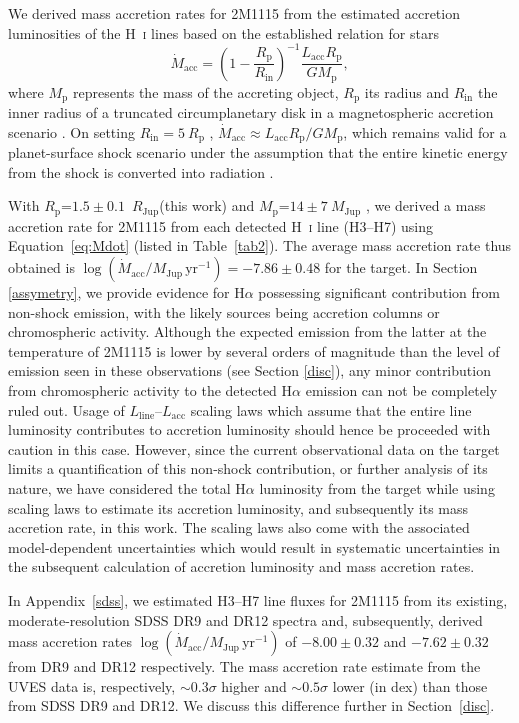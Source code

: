\documentclass{aa}
\newcommand{\mj}{\ensuremath{M_\mathrm{Jup}}\xspace}
\newcommand{\rj}{\ensuremath{R_\mathrm{Jup}}\xspace}
\newcommand{\mjyr}{\ensuremath{M_\mathrm{Jup}\,\mathrm{yr^{-1}}}\xspace}
\newcommand{\Mp}{\ensuremath{M_{\mathrm{p}}}\xspace}
\newcommand{\Rp}{\ensuremath{R_{\mathrm{p}}}\xspace}
\newcommand{\Ha}{\ensuremath{\mathrm{H}\alpha}\xspace}
\newcommand{\Lacc}{\ensuremath{L_{\mathrm{acc}}}\xspace}
\newcommand{\mdot}{\ensuremath{\dot{M}_{\mathrm{acc}}}\xspace}
\newcommand{\Lline}{\ensuremath{L_{\mathrm{line}}}\xspace}
\begin{document}
We derived mass accretion rates for 2M1115 from the estimated accretion luminosities of the H~\textsc{i} lines based on the established relation for stars
\begin{equation}
\label{eq:Mdot}
\mdot = \left( 1-\frac{\Rp}{R_{\mathrm{in}}} \right)^{-1} \frac{\Lacc\Rp}{G\Mp},
\end{equation}
where \Mp represents the mass of the accreting object, \Rp its radius and $R_{\mathrm{in}}$ the inner radius of a truncated circumplanetary disk in a magnetospheric accretion scenario \citep{hartmann2016}. On setting $R_{\mathrm{in}}=5~\Rp$ \citep{gullbring1998, alcala2017, ringqvist2023}, $\mdot\approx \Lacc\Rp/G\Mp$, which remains valid for a planet-surface shock scenario under the assumption that the entire kinetic energy from the shock is converted into radiation \citep{marleau2019}.



With \Rp=$1.5\pm0.1$~\rj (this work) and \Mp=$14\pm7~\mj$ \citep{theissen2018}, we derived a mass accretion rate for 2M1115 from each detected H~\textsc{i} line (H3--H7) using Equation~\ref{eq:Mdot} (listed in Table~\ref{tab2}). The average mass accretion rate thus obtained is $\log(\mdot/\mjyr)=-7.86\pm0.48$ for the target. In Section \ref{assymetry}, we provide evidence for \Ha possessing significant contribution from non-shock emission, with the likely sources being accretion columns or chromospheric activity. Although the expected emission from the latter at the temperature of 2M1115 is lower by several orders of magnitude than the level of emission seen in these observations (see Section \ref{disc}), any minor contribution from chromospheric activity to the detected \Ha emission can not be completely ruled out. 
Usage of \Lline--\Lacc scaling laws which assume that the entire line luminosity contributes to  accretion luminosity should hence be proceeded with caution in this case. However, since the current observational data on the target limits a quantification of this non-shock contribution, or further analysis of its nature, we have considered the total \Ha luminosity from the target while using scaling laws to estimate its accretion luminosity, and subsequently its mass accretion rate, in this work. The \cite{aoyama2021} scaling laws also come with the associated model-dependent uncertainties which would result in systematic uncertainties in the subsequent calculation of accretion luminosity and mass accretion rates. 

In Appendix~\ref{sdss}, we estimated H3--H7 line fluxes for 2M1115 from its existing, moderate-resolution SDSS DR9 \citep{sdss9} and DR12 \citep{sdss12} spectra and, subsequently, derived mass accretion rates $\log(\mdot/\mjyr)$ of $-8.00\pm0.32$ and $-7.62\pm0.32$ from DR9 and DR12 respectively. The mass accretion rate estimate from the UVES data is, respectively, $\sim 0.3\sigma$ higher and $\sim 0.5\sigma$ lower (in dex) than those from SDSS DR9 and DR12. We discuss this difference further in Section~\ref{disc}.  
\end{document}
